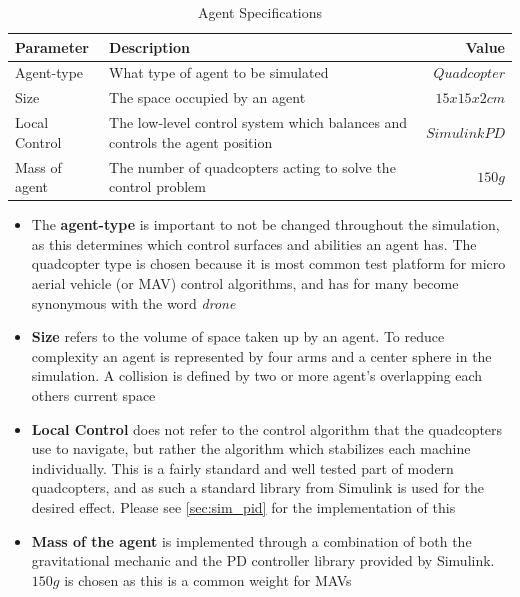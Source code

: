 \begin{table}[H]
\centering
\begin{tabularx}{1\textwidth}{l@{ }Xr}
\toprule
\textbf{Parameter}   & \textbf{Description}                                                        & \textbf{Value} \\ \midrule
Agent-type       	 & What type of agent to be simulated                                          & ${Quadcopter}$ \\
Size       		 	 & The space occupied by an agent                                    		   & ${15x15x2cm}$ \\
Local Control        & The low-level control system which balances and controls the agent position & ${Simulink PD}$\\
Mass of agent     	 & The number of quadcopters acting to solve the control problem               & ${150g}$        \\
\bottomrule
\end{tabularx}
\caption{Agent Specifications}
\label{tab:agent_specs}
\end{table}

\begin{itemize}
\item{The \textbf{agent-type} is important to not be changed throughout the simulation, as this determines which control surfaces and abilities an agent has. The quadcopter type is chosen because it is most common test platform for micro aerial vehicle (or MAV) control algorithms, and has for many become synonymous with the word \textit{drone} \cite{augugliaro_flight_2014}}
\item{\textbf{Size} refers to the volume of space taken up by an agent. To reduce complexity an agent is represented by four arms and a center sphere in the simulation. A collision is defined by two or more agent's overlapping each others current space}	
\item{\textbf{Local Control} does not refer to the control algorithm that the quadcopters use to navigate, but rather the algorithm which stabilizes each machine individually. This is a fairly standard and well tested part of modern quadcopters, and as such a standard library from Simulink is used for the desired effect. Please see \ref{sec:sim_pid} for the implementation of this}	
\item{\textbf{Mass of the agent} is implemented through a combination of both the gravitational mechanic and the PD controller library provided by Simulink. ${150g}$ is chosen as this is a common weight for MAVs}
\end{itemize}

